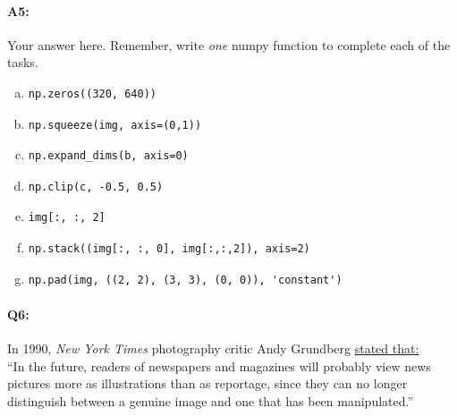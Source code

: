 \paragraph{A5:} Your answer here. Remember, write \emph{one} numpy function to complete each of the tasks.

\begin{enumerate}[(a)]
\item \begin{verbatim}np.zeros((320, 640))\end{verbatim}
\item \begin{verbatim}np.squeeze(img, axis=(0,1))\end{verbatim}
\item \begin{verbatim}np.expand_dims(b, axis=0)\end{verbatim}
\item \begin{verbatim}np.clip(c, -0.5, 0.5)\end{verbatim}
\item \begin{verbatim}img[:, :, 2]\end{verbatim}
\item \begin{verbatim}np.stack((img[:, :, 0], img[:,:,2]), axis=2)\end{verbatim}
\item \begin{verbatim}np.pad(img, ((2, 2), (3, 3), (0, 0)), 'constant')\end{verbatim}
\end{enumerate}


\pagebreak
\paragraph{Q6:} 
In 1990, \emph{New York Times} photography critic Andy Grundberg \href{https://www.nytimes.com/1990/08/12/arts/photography-view-ask-it-no-questions-the-camera-can-lie.html}{stated that:}\\``In the future, readers of newspapers and
magazines will probably view news pictures more as
illustrations than as reportage, since they can no longer distinguish between a genuine image and one that has been manipulated.''

